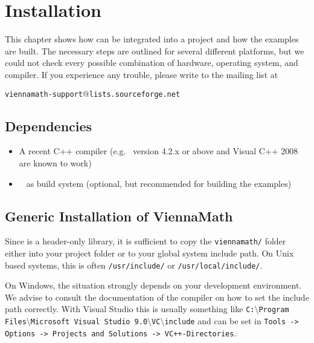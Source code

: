 \chapter{Installation}

This chapter shows how {\ViennaMath} can be integrated into a project and how
the examples are built. The necessary steps are outlined for several different
platforms, but we could not check every possible combination of hardware,
operating system, and compiler. If you experience any trouble, please write to
the mailing list at \\
\begin{center}
\texttt{viennamath-support$@$lists.sourceforge.net} 
\end{center}


\section{Dependencies}
\label{dependencies}

\begin{itemize}
 \item A recent C++ compiler (e.g.~{\GCC} version 4.2.x or above and Visual C++
2008 are known to work)
 \item {\CMake}~\cite{cmake} as build system (optional, but recommended
for building the examples)
\end{itemize}


\section{Generic Installation of ViennaMath} \label{sec:viennamath-installation}
Since {\ViennaMath} is a header-only library, it is sufficient to copy the 
\lstinline|viennamath/| folder either into your project folder or to your global system
include path. On Unix based systems, this is often \lstinline|/usr/include/| or
\lstinline|/usr/local/include/|.

On Windows, the situation strongly depends on your development environment. We
advise to consult the documentation of the compiler on how to set the include
path correctly. With Visual Studio this is usually something like
\texttt{C:$\setminus$Program Files$\setminus$Microsoft Visual Studio
9.0$\setminus$VC$\setminus$include}
and can be set in \texttt{Tools -> Options -> Projects and Solutions ->
VC++-\-Directories}. 


